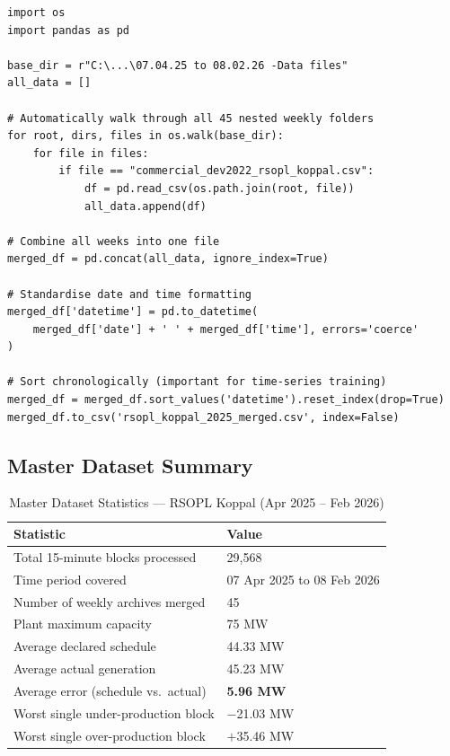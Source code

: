 \documentclass[12pt,a4paper]{report}
\begin{document}
\begin{lstlisting}[style=pythonstyle, caption={Python Script: Recursive SRPC Data Ingestion}]
import os
import pandas as pd

base_dir = r"C:\...\07.04.25 to 08.02.26 -Data files"
all_data = []

# Automatically walk through all 45 nested weekly folders
for root, dirs, files in os.walk(base_dir):
    for file in files:
        if file == "commercial_dev2022_rsopl_koppal.csv":
            df = pd.read_csv(os.path.join(root, file))
            all_data.append(df)

# Combine all weeks into one file
merged_df = pd.concat(all_data, ignore_index=True)

# Standardise date and time formatting
merged_df['datetime'] = pd.to_datetime(
    merged_df['date'] + ' ' + merged_df['time'], errors='coerce'
)

# Sort chronologically (important for time-series training)
merged_df = merged_df.sort_values('datetime').reset_index(drop=True)
merged_df.to_csv('rsopl_koppal_2025_merged.csv', index=False)
\end{lstlisting}

\subsection{Master Dataset Summary}

\begin{table}[H]
    \centering
    \caption{Master Dataset Statistics --- RSOPL Koppal (Apr 2025 -- Feb 2026)}
    \begin{tabular}{ll}
        \toprule
        \textbf{Statistic} & \textbf{Value} \\
        \midrule
        Total 15-minute blocks processed & 29,568 \\
        Time period covered & 07 Apr 2025 to 08 Feb 2026 \\
        Number of weekly archives merged & 45 \\
        Plant maximum capacity & 75 MW \\
        Average declared schedule & 44.33 MW \\
        Average actual generation & 45.23 MW \\
        Average error (schedule vs.\ actual) & \textbf{5.96 MW} \\
        Worst single under-production block & $-$21.03 MW \\
        Worst single over-production block & $+$35.46 MW \\
        \bottomrule
    \end{tabular}
\end{table}
\end{document}
